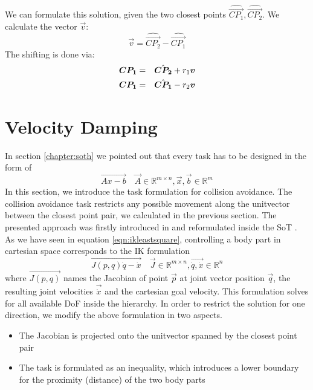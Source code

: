 We can formulate this solution, given the two closest points $\hat{\vec{CP_1}}, \hat{\vec{CP_2}}$. We calculate the vector $\vec{v}$:
\begin{equation}
\vec{v} = \hat{\vec{CP_2}}-\hat{\vec{CP_1}}
\end{equation}
The shifting is done via:
\begin{eqnarray}
\vec{CP_1} &=& \hat{\vec{CP_2}} + r_1 \vec{v} \notag \\
\vec{CP_1} &=& \hat{\vec{CP_1}} - r_2 \vec{v} \notag \\
\end{eqnarray}

\section{Velocity Damping}\label{sec:velocitydamping}
In section \ref{chapter:soth} we pointed out that every task has to be designed in the form of 
\begin{equation}
\vec{Ax-b} \quad  \vec{A} \in \mathbb{R}^{m \times n}, \vec{x} , \vec{b} \in \mathbb{R}^{m}
\end{equation}
In this section, we introduce the task formulation for collision avoidance. The collision avoidance task restricts any possible movement along the unitvector between the closest point pair, we calculated in the previous section. The presented approach was firstly introduced in \cite{Faverjon87alocal} and reformulated inside the SoT \cite{Kanehiro-RSS08}. 
As we have seen in equation \ref{eqn:ikleastsquare}, controlling a body part in cartesian space corresponds to the IK formulation  
\begin{equation}\label{gototask}
\vec{J(p,q) \dot{q} - \dot{x}} \quad  \vec{J} \in \mathbb{R}^{m \times n}, \vec{\dot{q}, \dot{x}} \in \mathbb{R}^{n}
\end{equation}
where $\vec{J(p,q)}$ names the Jacobian of point $\vec{p}$ at joint vector position $\vec{q}$, the resulting joint velocities $\vec{\dot{x}}$ and the cartesian goal velocity. This formulation solves for all available DoF inside the hierarchy. In order to restrict the solution for one direction, we modify the above formulation in two aspects.
\begin{itemize}
	\item The Jacobian is projected onto the unitvector spanned by the closest point pair
	\item The task is formulated as an inequality, which introduces a lower boundary for the proximity (distance) of the two body parts
\end{itemize}

